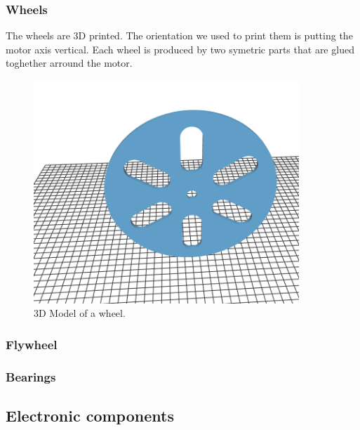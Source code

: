 \subsubsection{Wheels}
The wheels are 3D printed. The orientation we used to print them
is putting the motor axis vertical. Each wheel is produced by two
symetric parts that are glued toghether arround the motor.
\begin{figure}[H]
    \centering
    \includegraphics[width=10cm]{img/components/wheel.png}
    \caption{3D Model of a wheel.}
    \label{fig:}
\end{figure}
\subsubsection{Flywheel}
\subsubsection{Bearings}
\subsection{Electronic components}
